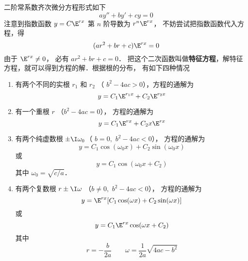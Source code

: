 

二阶常系数齐次微分方程形式如下
\begin{equation}
ay'' + by' + cy = 0
\end{equation}
注意到指数函数 $y = C{\E^{rx}}$ 第 $n$ 阶导数为 ${r^n}{\E^{rx}}$， 不妨尝试把指数函数代入方程，得
\begin{equation}
(a r^2 + br + c) \E^{rx} = 0
\end{equation}
由于 $\E^{rx} \ne 0$， 必有 $a r^2 + br + c = 0$． 把这个二次函数叫做\textbf{特征方程}，解特征方程，就可以得到方程的解．根据根的分布， 有如下四种情况

\begin{enumerate}
\item 有两个不同的实根 ${r_1}$ 和  ${r_2}$ （ ${b^2} - 4ac > 0$），方程的通解为
 \begin{equation}
y = {C_1}{\E^{{r_1}x}} + {C_2}{\E^{{r_2}x}}
\end{equation}
\item 有一个重根 $r$ （${b^2} - 4ac = 0$）， 方程的通解为
\begin{equation}\label{Ode2_eq4}
y = {C_1}{\E^{rx}} + {C_2}x{\E^{rx}}
\end{equation}
\item 有两个纯虚数根 $\pm \I \omega_0$（ $b = 0,\,\, b^2 - 4ac < 0$）， 方程的通解为
\begin{equation}
y = C_1\cos(\omega _0 x) + C_2 \sin(\omega _0 x)
\end{equation}
或 
\begin{equation}
y = C_1\cos(\omega _0 x + C_2)
\end{equation} 
其中 ${\omega _0} = \sqrt {{c}/{a}}$． 

\item 有两个复数根 $r \pm \I\omega $ （${b \ne 0,\,\,{b^2} - 4ac < 0}$）， 方程的通解为
\begin{equation}\label{Ode2_eq7}
y = \E^{rx} [ C_1\cos(\omega x) + C_2\sin(\omega x) ]
\end{equation} 
或 
\begin{equation}
y = C_1\E^{rx}\cos(\omega x + C_2)
\end{equation} 
其中
\begin{equation}
r =  - \frac{b}{2a} \qquad \omega  = \frac{1}{2a}\sqrt {4ac - b^2} 
\end{equation}

\end{enumerate}

